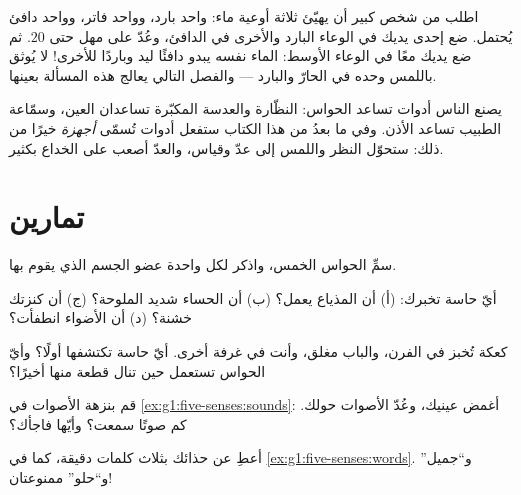 \begin{example}\label{ex:g1:five-senses:bowls}
اطلب من شخص كبير أن يهيّئ ثلاثة أوعية ماء: واحد بارد، وواحد فاتر،
وواحد دافئ يُحتمل. ضع إحدى يديك في الوعاء البارد والأخرى في
الدافئ، وعُدّ على مهل حتى $20$. ثم ضع يديك معًا في الوعاء
الأوسط: الماء نفسه يبدو دافئًا ليد وباردًا للأخرى! لا يُوثق باللمس
وحده في الحارّ والبارد --- والفصل التالي يعالج هذه المسألة بعينها.
\end{example}

\begin{remark}\label{rem:g1:five-senses:tools}
يصنع الناس أدوات تساعد الحواس: النظّارة والعدسة المكبّرة تساعدان
العين، وسمّاعة الطبيب تساعد الأذن. وفي ما بعدُ من هذا الكتاب
ستفعل أدوات تُسمّى \emph{أجهزة} خيرًا من ذلك: ستحوّل النظر واللمس
إلى عدّ وقياس، والعدّ أصعب على الخداع بكثير.
\end{remark}

\section{تمارين}

\begin{exercise}[$\star$]\label{exo:g1:five-senses:1}
سمِّ الحواس الخمس، واذكر لكل واحدة عضو الجسم الذي يقوم بها.
\end{exercise}

\begin{exercise}[$\star$]\label{exo:g1:five-senses:2}
أيّ حاسة تخبرك: (أ) أن المذياع يعمل؟ (ب) أن الحساء شديد الملوحة؟
(ج) أن كنزتك خشنة؟ (د) أن الأضواء انطفأت؟
\end{exercise}

\begin{exercise}[$\star$]\label{exo:g1:five-senses:3}
كعكة تُخبز في الفرن، والباب مغلق، وأنت في غرفة أخرى. أيّ حاسة
تكتشفها أولًا؟ وأيّ الحواس تستعمل حين تنال قطعة منها أخيرًا؟
\end{exercise}

\begin{exercise}[$\star$]\label{exo:g1:five-senses:4}
قم بنزهة الأصوات في \cref{ex:g1:five-senses:sounds}: أغمض عينيك،
وعُدّ الأصوات حولك. كم صوتًا سمعت؟ وأيّها فاجأك؟
\end{exercise}

\begin{exercise}[$\star$]\label{exo:g1:five-senses:5}
أعطِ  عن حذائك بثلاث كلمات دقيقة، كما في
\cref{ex:g1:five-senses:words}. و``جميل'' و``حلو'' ممنوعتان!
\end{exercise}

